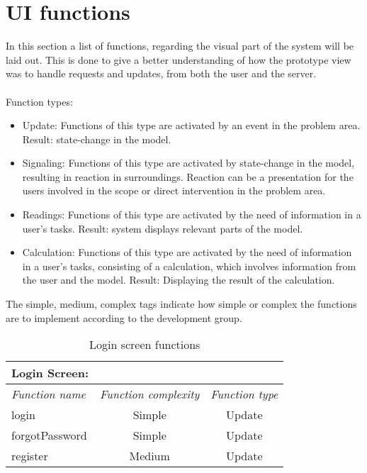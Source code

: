 \newpage
\section{UI functions}

In this section a list of functions, regarding the visual part of the system will be laid out. This is done to give a better understanding of how the prototype view was to handle requests and updates, from both the user and the server.
\\
\\
Function types:
\begin{itemize}
\item{Update: Functions of this type are activated by an event in the problem area. Result: state-change in the model.}

\item{Signaling: Functions of this type are activated by state-change in the model, resulting in reaction in surroundings. Reaction can be a presentation for the users involved in the scope or direct intervention in the problem area.}

\item{Readings: Functions of this type are activated by the need of information in a user's tasks. Result: system displays relevant parts of the model.}

\item{Calculation: Functions of this type are activated by the need of information in a user's tasks, consisting of a calculation, which involves information from the user and the model. Result: Displaying the result of the calculation.}

\end{itemize}

The simple, medium, complex tags indicate how simple or complex the functions are to implement according to the development group.

\begin{table}[!ht]
\centering
\begin{tabular}{ l  c  c }

Login Screen: &  & \\ \hline
\textit{Function name} & \textit{Function complexity} & \textit{Function type} \\ \hline
login & Simple & Update \\ \hline
forgotPassword & Simple & Update \\ \hline
register & Medium & Update \\ \hline
\end{tabular}
\caption{Login screen functions}
\label{tbl:loginscreen}
\end{table}

